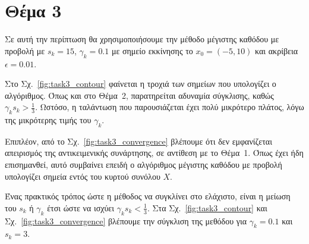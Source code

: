 \documentclass[a4paper,12pt]{article}
\begin{document}
\section*{Θέμα 3}
Σε αυτή την περίπτωση θα χρησιμοποιήσουμε την μέθοδο μέγιστης καθόδου με προβολή με $s_k = 15$, $\gamma_k = 0.1$
με σημείο εκκίνησης το $x_0 = (-5, 10)$ και ακρίβεια $\epsilon = 0.01$.

Στο Σχ.~\ref{fig:task3_contour} φαίνεται η τροχιά των σημείων που υπολογίζει ο αλγόριθμος. Όπως και στο Θέμα~2, 
παρατηρείται αδυναμία σύγκλισης, καθώς $\gamma_k s_k > \frac{1}{3}$. Ωστόσο, η ταλάντωση που παρουσιάζεται 
έχει πολύ μικρότερο πλάτος, λόγω της μικρότερης τιμής του $\gamma_k$. 

Επιπλέον, από το Σχ.~\ref{fig:task3_convergence} βλέπουμε ότι δεν εμφανίζεται απειρισμός της αντικειμενικής συνάρτησης, 
σε αντίθεση με το Θέμα~1. Όπως έχει ήδη επισημανθεί, αυτό συμβαίνει επειδή ο αλγόριθμος μέγιστης καθόδου με προβολή 
υπολογίζει σημεία εντός του κυρτού συνόλου $X$.

Ένας πρακτικός τρόπος ώστε η μέθοδος να συγκλίνει στο ελάχιστο, είναι η μείωση του $s_k$ ή $\gamma_k$ έτσι ώστε
να ισχύει $\gamma_k s_k < \frac{1}{3}$. Στα Σχ.~\ref{fig:task3_contour} και Σχ.~\ref{fig:task3_convergence} 
βλέπουμε την σύγκλιση της μεθόδου για $\gamma_k = 0.1$ και $s_k = 3$.
\end{document}
